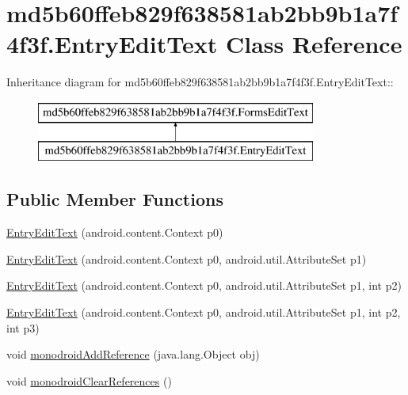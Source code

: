 \hypertarget{classmd5b60ffeb829f638581ab2bb9b1a7f4f3f_1_1_entry_edit_text}{
\section{md5b60ffeb829f638581ab2bb9b1a7f4f3f.EntryEditText Class Reference}
\label{classmd5b60ffeb829f638581ab2bb9b1a7f4f3f_1_1_entry_edit_text}
}
Inheritance diagram for md5b60ffeb829f638581ab2bb9b1a7f4f3f.EntryEditText::\begin{figure}[H]
\begin{center}
\leavevmode
\includegraphics[height=2cm]{classmd5b60ffeb829f638581ab2bb9b1a7f4f3f_1_1_entry_edit_text}
\end{center}
\end{figure}
\subsection*{Public Member Functions}
\begin{CompactItemize}
\item 
\hyperlink{classmd5b60ffeb829f638581ab2bb9b1a7f4f3f_1_1_entry_edit_text_43fa3f79c97f30676559ff6ab8a5773d}{EntryEditText} (android.content.Context p0)
\item 
\hyperlink{classmd5b60ffeb829f638581ab2bb9b1a7f4f3f_1_1_entry_edit_text_2ed76d0883a4b11b021ecdb18a945f8f}{EntryEditText} (android.content.Context p0, android.util.AttributeSet p1)
\item 
\hyperlink{classmd5b60ffeb829f638581ab2bb9b1a7f4f3f_1_1_entry_edit_text_0a1ed18804c51763e823cb1b17d9a256}{EntryEditText} (android.content.Context p0, android.util.AttributeSet p1, int p2)
\item 
\hyperlink{classmd5b60ffeb829f638581ab2bb9b1a7f4f3f_1_1_entry_edit_text_51d0a64d0a474ed8aabfefc92289d233}{EntryEditText} (android.content.Context p0, android.util.AttributeSet p1, int p2, int p3)
\item 
void \hyperlink{classmd5b60ffeb829f638581ab2bb9b1a7f4f3f_1_1_entry_edit_text_7472d6c3ce83f5d2334598037d779849}{monodroidAddReference} (java.lang.Object obj)
\item 
void \hyperlink{classmd5b60ffeb829f638581ab2bb9b1a7f4f3f_1_1_entry_edit_text_788af3e6d9362437aec111b13b19f2c3}{monodroidClearReferences} ()
\end{CompactItemize}
